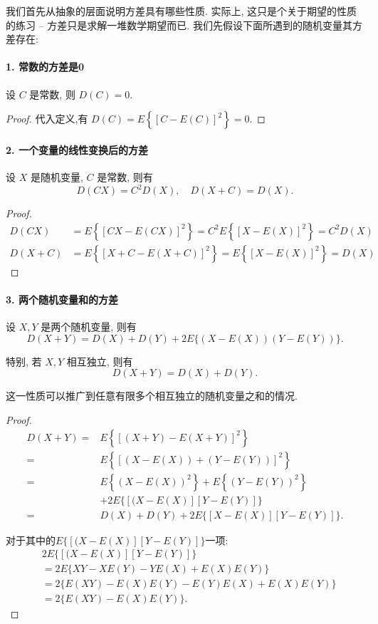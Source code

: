    我们首先从抽象的层面说明方差具有哪些性质. 实际上, 这只是个关于期望的性质的练习 -- 方差只是求解一堆数学期望而已. 我们先假设下面所遇到的随机变量其方差存在: 

   \paragraph{1. 常数的方差是0} 设 $C$ 是常数, 则 $D(C)=0$.
   \begin{proof}
    代入定义,有 $D(C)=E\left\{[C-E(C)]^2\right\}=0$.
   \end{proof}


   \paragraph{2. 一个变量的线性变换后的方差} 设 $X$ 是随机变量, $C$ 是常数, 则有
   $$
   D(C X)=C^2 D(X), \quad D(X+C)=D(X) .
   $$

   \begin{proof}
    
    $$
\begin{aligned}
D(C X) & =E\left\{[C X-E(C X)]^2\right\}=C^2 E\left\{[X-E(X)]^2\right\}=C^2 D(X) \\
D(X+C) & =E\left\{[X+C-E(X+C)]^2\right\}=E\left\{[X-E(X)]^2\right\}=D(X)
\end{aligned}
$$
   \end{proof}

   \paragraph{3. 两个随机变量和的方差} 设 $X, Y$ 是两个随机变量, 则有
   $$
   D(X+Y)=D(X)+D(Y)+2 E\{(X-E(X))(Y-E(Y))\} .
   $$
   
   特别, 若 $X, Y$ 相互独立, 则有
   $$
   D(X+Y)=D(X)+D(Y) .
   $$
   
   这一性质可以推广到任意有限多个相互独立的随机变量之和的情况.

   \begin{proof}
    $$
\begin{aligned}
D(X+Y)= & E\left\{[(X+Y)-E(X+Y)]^2\right\} \\
= & E\left\{[(X-E(X))+(Y-E(Y))]^2\right\} \\
= & E\left\{(X-E(X))^2\right\}+E\left\{(Y-E(Y))^2\right\} \\
& +2 E\{[(X-E(X)][Y-E(Y)]\} \\
= & D(X)+D(Y)+2 E\{[X-E(X)][Y-E(Y)]\} .
\end{aligned}
$$

对于其中的$ E\{[(X-E(X)][Y-E(Y)]\}$一项: $$
\begin{aligned}
& 2 E\{[(X-E(X)][Y-E(Y)]\} \\
& =2 E\{X Y-X E(Y)-Y E(X)+E(X) E(Y)\} \\
& =2\{E(X Y)-E(X) E(Y)-E(Y) E(X)+E(X) E(Y)\} \\
& =2\{E(X Y)-E(X) E(Y)\} .
\end{aligned}
$$
   \end{proof}

